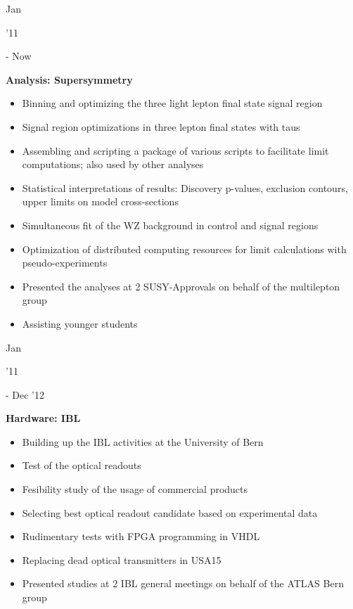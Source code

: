 \documentclass[]{cv} %
\begin{document}
\begin{entrylist}

\entry
{\parbox[t]{\parboxWidthOne}{Jan}\parbox[t]{\parboxWidthTwo}{\hfill '11} - Now}
{\textbf{Analysis: Supersymmetry}
  \vspace{3pt}
  \begin{itemize}
  \item Binning and optimizing the three light lepton final state signal region
  \item Signal region optimizations in three lepton final states with taus
  \item Assembling and scripting a package of various scripts to facilitate limit computations; also used by other analyses
  \item Statistical interpretations of results: Discovery p-values, exclusion contours, upper limits on model cross-sections
  \item Simultaneous fit of the WZ background in control and signal regions
  \item Optimization of distributed computing resources for limit calculations with pseudo-experiments
  \item Presented the analyses at 2 SUSY-Approvals on behalf of the multilepton group
  \item Assisting younger students
\end{itemize}}
{}
  {\vspace*{-22pt}}

  \entry
  {\parbox[t]{\parboxWidthOne}{Jan}\parbox[t]{\parboxWidthTwo}{\hfill '11} - Dec '12}
  {\textbf{Hardware: IBL}
  \vspace{3pt}
    \begin{itemize}
      \item Building up the IBL activities at the University of Bern
      \item Test of the optical readouts
      \item Fesibility study of the usage of commercial products
      \item Selecting best optical readout candidate based on experimental data
      \item Rudimentary tests with FPGA programming in VHDL
      \item Replacing dead optical transmitters in USA15
      \item Presented studies at 2 IBL general meetings on behalf of the ATLAS Bern group
  \end{itemize}}
  {}
  {\vspace*{-22pt}}

\end{entrylist}
\end{document}
